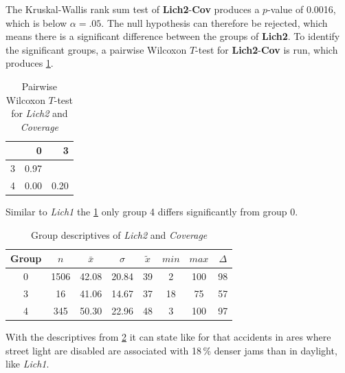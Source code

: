 The Kruskal-Wallis rank sum test of \textbf{Lich2}-\textbf{Cov} produces a $p$-value of 0.0016, which is below $\alpha=.05$. The null hypothesis can therefore be rejected, which means there is a significant difference between the groups of \textbf{Lich2}. To identify the significant groups, a pairwise Wilcoxon $T$-test for \textbf{Lich2}-\textbf{Cov} is run, which produces \cref{tbl:wilcoxon_baysis_matched_Lich2_Cov}. 
\begin{table}[ht!]
	\tiny
	\centering
    \begin{tabular}{rrr}
        \toprule
        & 0 & 3 \\ 
        \midrule
        3 & 0.97 &  \\ 
        4 & 0.00 & 0.20 \\ 
        \hline
      \end{tabular}
	\caption{Pairwise Wilcoxon $T$-test for \textit{Lich2} and \textit{Coverage}}
	\label{tbl:wilcoxon_baysis_matched_Lich2_Cov}
\end{table}
Similar to \textit{Lich1} the \cref{tbl:wilcoxon_baysis_matched_Lich2_Cov} only group 4 differs significantly from group 0. 
\begin{table}[ht!]
	\tiny
	\centering
    \begin{tabular}{c|c|c|c|c|c|c|c}
        \toprule
        Group & $n$ & $\bar{x}$ & $\sigma$ & $\tilde{x}$ & $min$ & $max$ & $\Delta$ \\   
        \midrule
        0 & 1506 & 42.08 & 20.84 & 39 & 2  & 100 & 98 \\ 
        3 & 16   & 41.06 & 14.67 & 37 & 18 & 75  & 57 \\ 
        4 & 345  & 50.30 & 22.96 & 48 & 3  & 100 & 97 \\ 
        \bottomrule
      \end{tabular}
	\caption{Group descriptives of \textit{Lich2} and \textit{Coverage}}
	\label{tbl:descriptives_baysis_matched_Lich2_Cov}
\end{table}
With the descriptives from \cref{tbl:descriptives_baysis_matched_Lich2_Cov} it can state like for that accidents in ares where street light are disabled are associated with 18\,\% denser jams than in daylight, like \textit{Lich1}.

